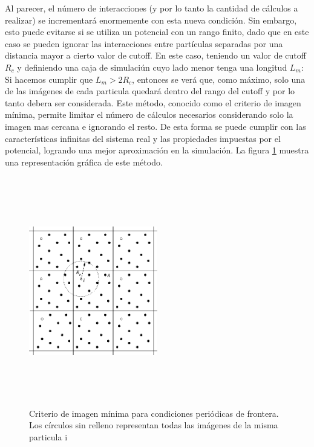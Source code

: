 \documentclass[a4paper,10pt]{report}
\begin{document}
Al parecer, el número de interacciones (y por lo tanto la cantidad de cálculos a realizar) se incrementará enormemente con esta nueva condición. 
Sin embargo, esto puede evitarse si se utiliza un potencial con un rango finito, dado que en este caso se pueden ignorar las interacciones entre partículas separadas por una distancia mayor a cierto valor de cutoff.
En este caso, teniendo un valor de cutoff $R_{c}$ y definiendo una caja de simulaciún cuyo lado menor tenga una longitud $L_m$: 
Si hacemos cumplir que $L_m>2R_{c}$, entonces se verá que, como máximo, solo una de las imágenes de cada particula quedará dentro del rango del cutoff y por lo tanto debera ser considerada.
Este método, conocido como el criterio de imagen mínima, permite limitar el número de cálculos necesarios considerando solo la imagen mas cercana e ignorando el resto. 
De esta forma se puede cumplir con las características infinitas del sistema real y las propiedades impuestas por el potencial, logrando una mejor aproximación en la simulación.
La figura \ref{minimage} muestra una representación gráfica de este método. 


\begin{figure}[!ht]
\centering
\includegraphics[keepaspectratio, height=10cm ,width=0.5\textwidth]{img/minimage.png}
\caption{Criterio de imagen mínima para condiciones periódicas de frontera. Los círculos sin relleno representan todas las imágenes de la misma particula i}
\label{minimage}
\end{figure}


\end{document}
